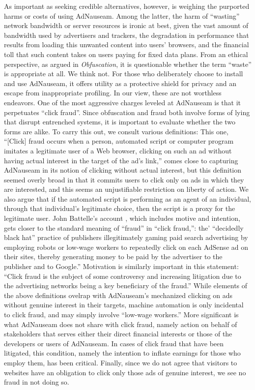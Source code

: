 \documentclass[conference]{IEEEtran}
\begin{document}
As important as seeking credible alternatives, however, is weighing the purported harms or costs of using AdNauseam. Among the latter, the harm of ``wasting'' network bandwidth or server resources is ironic at best, given the vast amount of bandwidth used by advertisers and trackers, the degradation in performance that results from loading this unwanted content into users' browsers, and the financial toll that such content takes on users paying for fixed data plans. From an ethical perspective, as argued in  \emph{Obfuscation}, it is questionable whether the term ``waste'' is appropriate at all. We think not. For those who deliberately choose to install and use AdNauseam, it offers utility as a protective shield for privacy and an escape from inappropriate profiling. In our view, these are not worthless endeavors.
One of the most aggressive charges leveled at AdNauseam is that it perpetuates ``click fraud''. Since obfuscation and fraud both involve forms of lying that disrupt entrenched systems, it is important to evaluate whether the two forms are alike.  To carry this out, we consult various definitions: This one,   ``[Click] fraud occurs when a person, automated script or computer program imitates a legitimate user of a Web browser, clicking on such an ad without having actual interest in the target of the ad's link,'' \cite{Liu} comes close to capturing AdNauseam in its notion of clicking without actual interest, but this definition seemed overly broad in that it commits users to click only on ads in which they are interested, and this seems an unjustifiable restriction on liberty of action. We also argue that if the automated script is performing as an agent of an individual, through that individual's legitimate choice, then the script is a proxy for the legitimate user. John Battelle's account \cite{Battelle}, which includes motive and intention, gets closer to the standard meaning of ``fraud'' in ``click fraud,'': the' ``decidedly black hat'' practice of publishers illegitimately gaming paid search advertising by employing robots or low-wage workers to repeatedly click on each AdSense ad on their sites, thereby generating money to be paid by the advertiser to the publisher and to Google.'' Motivation is similarly important in this statement: ``Click fraud is the subject of some controversy and increasing litigation due to the advertising networks being a key beneficiary of the fraud.'' \cite{ClickFraud}
While elements of the above definitions ovelrap with AdNauseam's mechanized clicking on ads without genuine interest in their targets, machine automation is only incidental to click fraud, and may simply involve ``low-wage workers.'' More significant is what AdNauseam does not share with click fraud, namely action on behalf of stakeholders that serves either their direct financial interests or those of the developers or users of AdNauseam. In cases of click fraud that have been litigated, this condition, namely the intention to inflate earnings for those who employ them, has been critical. Finally, since we do not agree that visitors to websites have an obligation to click only those ads of genuine interest, we see no fraud in not doing so.
\end{document}
